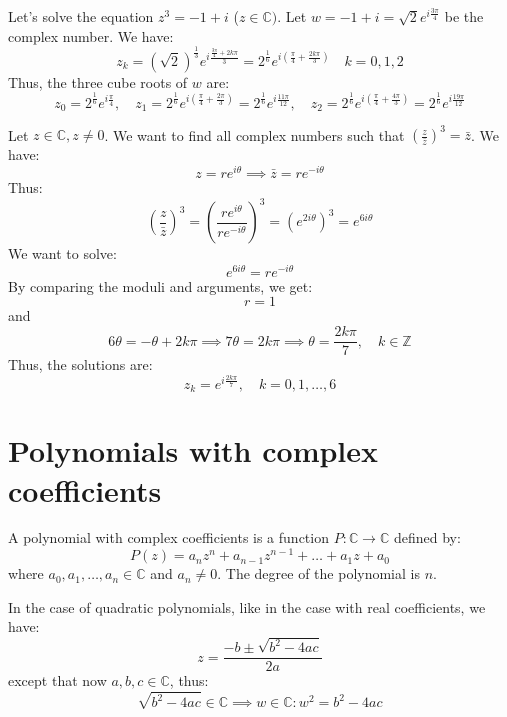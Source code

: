 \begin{eg}
    Let's solve the equation $z^3 = -1 + i$ ($z \in \mathbb{C})$. Let $w = -1 + i = \sqrt{2} e^{i \frac{3\pi}{4}}$ be the complex number. We have:
    \[
        z_k = (\sqrt{2})^{\frac{1}{3}} e^{i \frac{\frac{3\pi}{4} + 2k\pi}{3}} = 2^{\frac{1}{6}} e^{i \left(\frac{\pi}{4} + \frac{2k\pi}{3}\right)} \quad k = 0, 1, 2
    \]
    Thus, the three cube roots of $w$ are:
    \[
        z_0 = 2^{\frac{1}{6}} e^{i \frac{\pi}{4}}, \quad z_1 = 2^{\frac{1}{6}} e^{i \left(\frac{\pi}{4} + \frac{2\pi}{3}\right)} = 2^{\frac{1}{6}} e^{i \frac{11\pi}{12}}, \quad z_2 = 2^{\frac{1}{6}} e^{i \left(\frac{\pi}{4} + \frac{4\pi}{3}\right)} = 2^{\frac{1}{6}} e^{i \frac{19\pi}{12}}
    \]
\end{eg}

\begin{eg}
    Let $z \in \mathbb{C}, z \neq 0$. We want to find all complex numbers such that $(\frac{z}{\bar{z}})^3 = \bar{z}$. We have:
    \[
        z = r e^{i \theta} \implies \bar{z} = r e^{-i \theta}
    \]
    Thus:
    \[
        \left(\frac{z}{\bar{z}}\right)^3 = \left(\frac{r e^{i \theta}}{r e^{-i \theta}}\right)^3 = (e^{2i \theta})^3 = e^{6i \theta}
    \]
    We want to solve:
    \[        e^{6i \theta} = r e^{-i \theta}
    \]
    By comparing the moduli and arguments, we get:
    \[        r = 1
    \]
    and
    \[        6 \theta = -\theta + 2k\pi \implies 7 \theta = 2k\pi \implies \theta = \frac{2k\pi}{7}, \quad k \in \mathbb{Z}
    \]
    Thus, the solutions are:
    \[        z_k = e^{i \frac{2k\pi}{7}}, \quad k = 0, 1, \ldots, 6 \]
\end{eg}

\section{Polynomials with complex coefficients}
\begin{definition}
    A polynomial with complex coefficients is a function $P: \mathbb{C} \to \mathbb{C}$ defined by:
    \[
        P(z) = a_n z^n + a_{n-1} z^{n-1} + \ldots + a_1 z + a_0
    \]
    where $a_0, a_1, \ldots, a_n \in \mathbb{C}$ and $a_n \neq 0$. The degree of the polynomial is $n$.
\end{definition}
In the case of quadratic polynomials, like in the case with real coefficients, we have:
\[
    z = \frac{-b \pm \sqrt{b^2 - 4ac}}{2a}
\]
except that now $a, b, c \in \mathbb{C}$, thus:
\[
    \sqrt{b^2 - 4ac} \in \mathbb{C} \implies w \in \mathbb{C} : w^2 = b^2 - 4ac
\]

